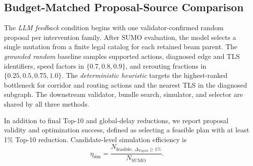 \documentclass{trbunofficial}
\begin{document}
\subsection{Budget-Matched Proposal-Source Comparison}
\label{sec:proposal-source-comparison}

The \emph{LLM feedback} condition begins with one validator-confirmed random
proposal per intervention family.  After SUMO evaluation, the model selects a
single mutation from a finite legal catalog for each retained beam parent.  The
\emph{grounded random} baseline samples supported actions, diagnosed edge and
TLS identifiers, speed factors in $\{0.7,0.8,0.9\}$, and rerouting fractions in
$\{0.25,0.5,0.75,1.0\}$.  The \emph{deterministic heuristic} targets the
highest-ranked bottleneck for corridor and routing actions and the nearest TLS
in the diagnosed subgraph.  The downstream validator, bundle search, simulator,
and selector are shared by all three methods.

In addition to final Top-10 and global-delay reductions, we report proposal
validity and optimization success, defined as selecting a feasible plan with at
least 1\% Top-10 reduction.  Candidate-level simulation efficiency is
\begin{equation}
  \eta_{\mathrm{sim}}=
  \frac{N_{\mathrm{feasible},\,\Delta_{\mathrm{Top10}}\geq1\%}}
       {N_{\mathrm{SUMO}}}.
  \label{eq:simulation-efficiency}
\end{equation}

\begin{table}[!ht]
  \caption{Budget-matched proposal-source comparison over five networks and three demand seeds. Success denotes a feasible selected plan with at least 1\% Top-10 reduction.}
  \label{tab:proposal-source-comparison}
  \begin{center}
    \small
    \setlength{\tabcolsep}{4pt}
  \end{center}
\end{table}
\end{document}
